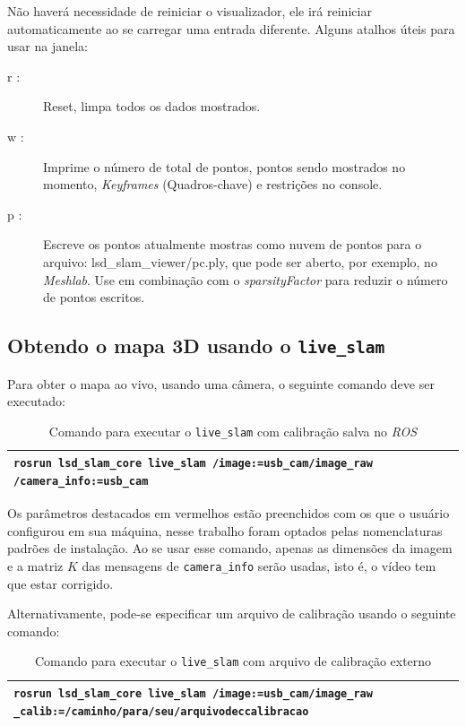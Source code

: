 Não haverá necessidade de reiniciar o visualizador, ele irá reiniciar automaticamente ao se carregar uma entrada diferente. Alguns atalhos úteis para usar na janela:

\begin{description}
	\item[r :]{Reset, limpa todos os dados mostrados.}
	\item[w :]{Imprime o número de total de pontos, pontos sendo mostrados no momento, \textit{Keyframes} (Quadros-chave) e restrições no console.}
	\item[p :]{Escreve os pontos atualmente mostras como nuvem de pontos para o arquivo: lsd\_slam\_viewer/pc.ply, que pode ser aberto, por exemplo, no \textit{Meshlab}. Use  em combinação com o \textit{sparsityFactor}  para reduzir o número de pontos escritos.}
\end{description}	

\subsection{Obtendo o mapa 3D usando o \texttt{live\_slam}}

Para obter o mapa ao vivo, usando uma câmera, o seguinte comando deve ser executado:

\begin{table}[!ht]\label{tb:14}
\begin{tabular}{| p{\textwidth}|}
\hline
\texttt{rosrun lsd\_slam\_core live\_slam /image:=usb\_cam/image\_raw /camera\_info:=usb\_cam}\\
\hline
\end{tabular}
\caption{Comando para executar o \texttt{live\_slam} com calibração salva no \textit{ROS}}
\end{table}

Os parâmetros destacados em vermelhos estão preenchidos com os que o usuário configurou em sua máquina, nesse trabalho foram optados pelas nomenclaturas padrões de instalação. Ao se usar esse comando, apenas as dimensões da imagem e a matriz $K$ das mensagens de \texttt{camera\_info} serão usadas, isto é, o vídeo tem que estar corrigido.

Alternativamente, pode-se especificar um arquivo de calibração usando o seguinte comando:

\begin{table}[!ht]\label{tb:15}
\begin{tabular}{| p{\textwidth}|}
\hline
\texttt{rosrun lsd\_slam\_core live\_slam /image:=usb\_cam/image\_raw \_calib:=/caminho/para/seu/arquivodeccalibracao}\\
\hline
\end{tabular}
\caption{Comando para executar o \texttt{live\_slam} com arquivo de calibração externo}
\end{table}

